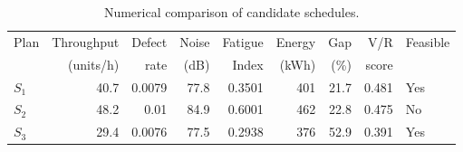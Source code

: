 \begin{table}[htbp]
\centering
\caption{Numerical comparison of candidate schedules.}
\label{tab:numerical-sim}
\small
\begin{tabular}{@{}lrrrrrrrl@{}}
\toprule
Plan & Throughput & Defect & Noise & Fatigue & Energy & Gap & V/R & Feasible \\
     & (units/h)  & rate   & (dB)  & Index   & (kWh)  & (\%) & score &         \\
\midrule
$S_{1}$ & 40.7 & 0.0079 & 77.8 & 0.3501 & 401 & 21.7 & 0.481 & Yes \\
$S_{2}$ & 48.2 & 0.01 & 84.9 & 0.6001 & 462 & 22.8 & 0.475 & No \\
$S_{3}$ & 29.4 & 0.0076 & 77.5 & 0.2938 & 376 & 52.9 & 0.391 & Yes \\
\bottomrule
\end{tabular}
\end{table}

